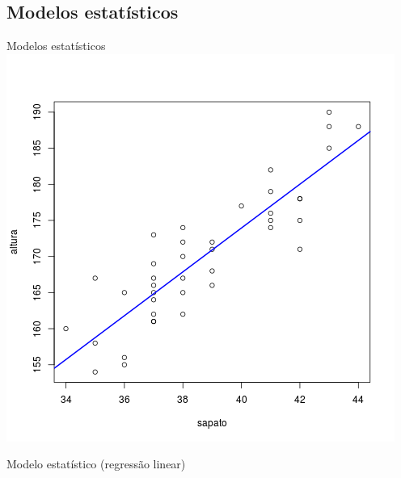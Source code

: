 \documentclass{beamer}
\begin{document}
\subsection{Modelos estatísticos}

\begin{frame}{Modelos estatísticos}
  \centering
  \includegraphics[height=.9\textheight]{modelos/alturas_sapatos}

Modelo estatístico (regressão linear)
\end{frame}
\end{document}
